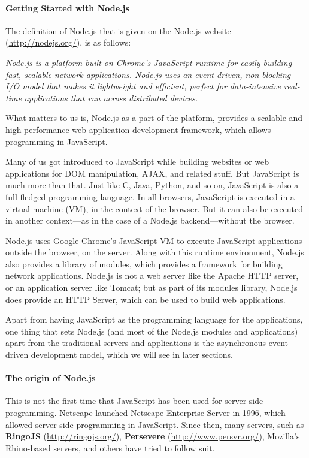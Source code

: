 \paragraph*{Getting Started with Node.js}
\hfill \break
The definition of Node.js that is given on the Node.js website
(\href{http://nodejs.org/}{http://nodejs.org/}), is as follows:
\begin{sloppypar}
\textit{Node.js is a platform built on Chrome's JavaScript runtime for easily building
fast, scalable network applications. Node.js uses an event-driven, non-blocking I/O
model that makes it lightweight and efficient, perfect for data-intensive real-time
applications that run across distributed devices.}
\end{sloppypar}
What matters to us is, Node.js as a part of the platform, provides a scalable and
high-performance web application development framework, which allows
programming in JavaScript.

Many of us got introduced to JavaScript while building websites or web applications
for DOM manipulation, AJAX, and related stuff. But JavaScript is much more
than that. Just like C, Java, Python, and so on, JavaScript is also a full-fledged
programming language. In all browsers, JavaScript is executed in a virtual
machine (VM), in the context of the browser. But it can also be executed in
another context—as in the case of a Node.js backend—without the browser.

Node.js uses Google Chrome's JavaScript VM to execute JavaScript applications
outside the browser, on the server. Along with this runtime environment,
Node.js also provides a library of modules, which provides a framework for
building network applications. Node.js is not a web server like the Apache HTTP
server, or an application server like Tomcat; but as part of its modules library,
Node.js does provide an HTTP Server, which can be used to build web applications.

Apart from having JavaScript as the programming language for the applications,
one thing that sets Node.js (and most of the Node.js modules and applications)
apart from the traditional servers and applications is the asynchronous event-driven
development model, which we will see in later sections.\cite{16}

\paragraph*{The origin of Node.js}
\hfill \break
This is not the first time that JavaScript has been used for server-side programming.
Netscape launched Netscape Enterprise Server in 1996, which allowed server-side
programming in JavaScript. Since then, many servers, such as \textbf{RingoJS}
(\href{http://ringojs.org/}{http://ringojs.org/}), \textbf{Persevere} (\href{http://www.persvr.org/}{http://www.persvr.org/}), Mozilla's
Rhino-based servers, and others have tried to follow suit.\cite{16}


